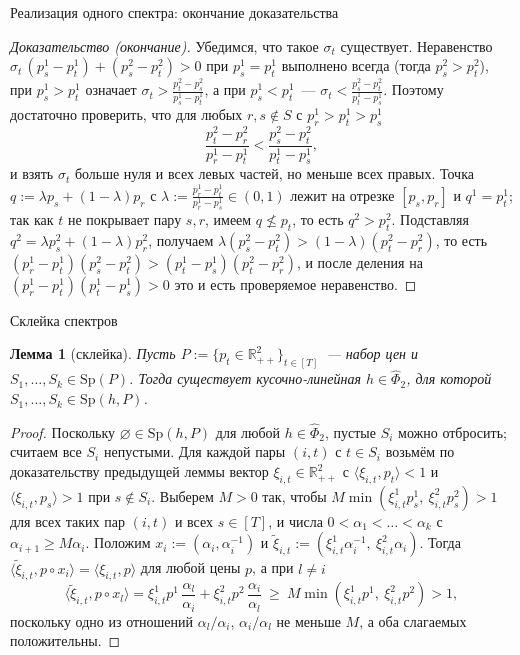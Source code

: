 \documentclass[10pt,aspectratio=169]{beamer}
\theoremstyle{plain}
\newtheorem{lem}{Лемма}
\theoremstyle{definition}
\newcommand{\R}{\mathbb{R}}
\newcommand{\ip}[2]{\langle #1, #2\rangle}
\newcommand{\Rpp}[1][2]{\R^{#1}_{++}}
\begin{document}
\begin{frame}{Реализация одного спектра: окончание доказательства}
    \begin{proof}[Доказательство (окончание)]
        Убедимся, что такое $\sigma_t$ существует. Неравенство $\sigma_t\,(p^1_s-p^1_t)+(p^2_s-p^2_t)>0$ при $p^1_s=p^1_t$ выполнено всегда (тогда $p^2_s>p^2_t$), при $p^1_s>p^1_t$ означает $\sigma_t>\frac{p^2_t-p^2_s}{p^1_s-p^1_t}$, а при $p^1_s<p^1_t$~--- $\sigma_t<\frac{p^2_s-p^2_t}{p^1_t-p^1_s}$. Поэтому достаточно проверить, что для любых $r,s\notin S$ с $p^1_r>p^1_t>p^1_s$
        \[
            \frac{p^2_t-p^2_r}{p^1_r-p^1_t}<\frac{p^2_s-p^2_t}{p^1_t-p^1_s},
        \]
        и взять $\sigma_t$ больше нуля и всех левых частей, но меньше всех правых. Точка $q:=\lambda p_s+(1-\lambda)p_r$ с $\lambda:=\frac{p^1_r-p^1_t}{p^1_r-p^1_s}\in(0,1)$ лежит на отрезке $[p_s,p_r]$ и $q^1=p^1_t$; так как $t$ не покрывает пару $s,r$, имеем $q\not\le p_t$, то есть $q^2>p^2_t$. Подставляя $q^2=\lambda p^2_s+(1-\lambda)p^2_r$, получаем $\lambda(p^2_s-p^2_t)>(1-\lambda)(p^2_t-p^2_r)$, то есть $(p^1_r-p^1_t)(p^2_s-p^2_t)>(p^1_t-p^1_s)(p^2_t-p^2_r)$, и после деления на $(p^1_r-p^1_t)(p^1_t-p^1_s)>0$ это и есть проверяемое неравенство.
    \end{proof}
\end{frame}

\begin{frame}{Склейка спектров}
    \begin{lem}[склейка]\label{lem:patch}
        Пусть $P:=\{p_{t}\in\Rpp\}_{t\in[T]}$~--- набор цен и $S_1,\dots,S_k\in\mathrm{Sp}(P)$. Тогда существует кусочно-линейная $h\in\hat\Phi_2$, для которой $S_1,\dots,S_k\in\mathrm{Sp}(h,P)$.
    \end{lem}

    \begin{proof}
        Поскольку $\varnothing\in\mathrm{Sp}(h,P)$ для любой $h\in\hat\Phi_2$, пустые $S_i$ можно отбросить; считаем все $S_i$ непустыми. Для каждой пары $(i,t)$ с $t\in S_i$ возьмём по доказательству предыдущей леммы вектор $\xi_{i,t}\in\Rpp$ с $\ip{\xi_{i,t}}{p_t}<1$ и $\ip{\xi_{i,t}}{p_s}>1$ при $s\notin S_i$. Выберем $M>0$ так, чтобы $M\min(\xi^1_{i,t}p^1_s,\ \xi^2_{i,t}p^2_s)>1$ для всех таких пар $(i,t)$ и всех $s\in[T]$, и числа $0<\alpha_1<\dots<\alpha_k$ с $\alpha_{i+1}\ge M\alpha_i$. Положим $x_i:=(\alpha_i,\alpha_i^{-1})$ и $\tilde\xi_{i,t}:=(\xi^1_{i,t}\alpha_i^{-1},\ \xi^2_{i,t}\alpha_i)$. Тогда $\ip{\tilde\xi_{i,t}}{p\circ x_i}=\ip{\xi_{i,t}}{p}$ для любой цены $p$, а при $l\ne i$
        \[
            \ip{\tilde\xi_{i,t}}{p\circ x_l}=\xi^1_{i,t}p^1\,\frac{\alpha_l}{\alpha_i}+\xi^2_{i,t}p^2\,\frac{\alpha_i}{\alpha_l}\ \ge\ M\min(\xi^1_{i,t}p^1,\ \xi^2_{i,t}p^2)>1,
        \]
        поскольку одно из отношений $\alpha_l/\alpha_i$, $\alpha_i/\alpha_l$ не меньше $M$, а оба слагаемых положительны.
    \end{proof}
\end{frame}
\end{document}
